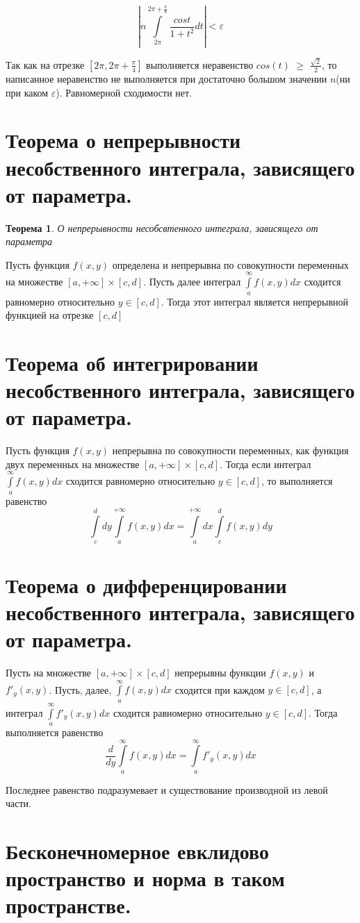 \documentclass[12pt, a4paper]{article}
\newtheorem{thm}{Теорема}
\begin{document}
$$| n\int\limits_{2\pi}^{2\pi + \frac{\pi}{4}}\frac{cost}{1 + t^2}dt| < \varepsilon$$

Так как на отрезке $[2\pi, 2\pi + \frac{\pi}{4}]$ выполняется неравенство
$cos(t) $ $ \geq$ $ \frac{\sqrt{2}}{2}$, то написанное неравенство не 
выполняется при достаточно большом значении $n$(ни при каком $\varepsilon$).
Равномерной сходимости нет.

\section{Теорема о непрерывности несобственного интеграла, зависящего от параметра.}
\begin{thm}
    О непрерывности несобсвтенного интеграла, зависящего от параметра
\end{thm}
Пусть функция $f(x, y)$ определена и непрерывна по совокупности переменных
на множестве $[a, +\infty] \times [c, d]$. Пусть далее интеграл
$\int\limits_a^{\infty}f(x, y)dx$ сходится равномерно относительно $y \in [c, d]$.
Тогда этот интеграл является непрерывной функцией на отрезке $[c, d]$

\section{Теорема об интегрировании несобственного интеграла, зависящего от параметра.}
Пусть функция $f(x, y)$ непрерывна по совокупности переменных, как функция
двух переменных на множестве $[a, +\infty] \times [c, d]$. Тогда если
интеграл $\int\limits_a^{\infty}f(x, y)dx$ сходится равномерно относительно
$y \in [c, d]$, то выполняется равенство
$$\int\limits_c^d dy \int\limits_a^{+\infty}f(x, y)dx = 
\int\limits_a^{+\infty} dx \int\limits_c^d f(x, y)dy $$

\section{Теорема о дифференцировании несобственного интеграла, зависящего от параметра.}
Пусть на множестве $[a, +\infty] \times [c, d]$ непрерывны функции
$f(x, y)$ и $f'_y(x, y)$. Пусть, далее, $\int\limits_a^{\infty}f(x, y)dx$
сходится при каждом $y \in [c, d]$, а интеграл
$\int\limits_a^{\infty}f'_y(x, y)dx$ сходится равномерно
относительно $y \in [c, d]$. Тогда выполняется равенство
$$\frac{d}{dy}\int\limits_a^{\infty}f(x, y)dx  = 
\int\limits_a^{\infty}f'_y(x, y)dx$$

Последнее равенство подразумевает и существование производной из левой части.
\section{Бесконечномерное евклидово пространство и норма в таком пространстве.}
\end{document}
